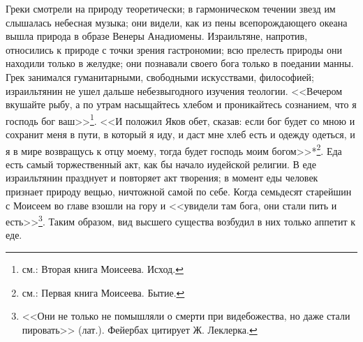 \documentclass[12pt,oneside]{book}
\begin{document}
Греки смотрели на природу теоретически; в гармоническом течении звезд им слышалась небесная музыка; они видели, как из пены всепорождающего океана вышла природа в образе Венеры Анадиомены. Израильтяне, напротив, относились к природе с точки зрения гастрономии; всю прелесть природы они находили только в желудке; они познавали своего бога только в поедании манны. Грек занимался гуманитарными, свободными искусствами, философией; израильтянин не ушел дальше небезвыгодного изучения теологии. <<Вечером вкушайте рыбу, а по утрам насыщайтесь хлебом и проникайтесь сознанием, что я господь бог ваш>>\ddag\let\svthefootnote\thefootnote\let\thefootnote\relax{}\let\thefootnote\svthefootnote\footnote{см.: Вторая книга Моисеева. Исход.}. <<И положил Яков обет, сказав: если бог будет со мною и сохранит меня в пути, в который я иду, и даст мне хлеб есть и одежду одеться, и я в мире возвращусь к отцу моему, тогда будет господь моим богом>>*\let\svthefootnote\thefootnote\let\thefootnote\relax{}\let\thefootnote\svthefootnote\footnote{см.: Первая книга Моисеева. Бытие.}. Еда есть самый торжественный акт, как бы начало иудейской религии. В еде израильтянин празднует и повторяет акт творения; в момент еды человек признает природу вещью, ничтожной самой по себе. Когда семьдесят старейшин с Моисеем во главе взошли на гору и <<увидели там бога, они стали пить и есть>>\dag\let\svthefootnote\thefootnote\let\thefootnote\relax{}\let\thefootnote\svthefootnote\footnote{<<Они не только не помышляли о смерти при видебожества, но даже стали пировать>> (лат.). Фейербах цитирует Ж. Леклерка.}. Таким образом, вид высшего существа возбудил в них только аппетит к еде.
\end{document}
